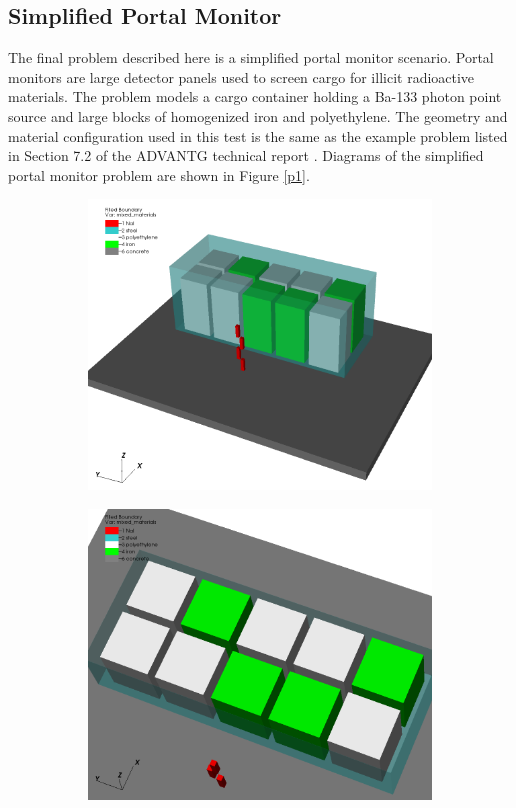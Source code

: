 \documentclass{article} %
\begin{document}
\subsection{Simplified Portal Monitor}

The final problem described here is a simplified portal monitor scenario.
Portal monitors are large detector panels used to screen cargo for illicit
radioactive materials. The problem models a cargo container holding a Ba-133
photon point source and large blocks of homogenized iron and polyethylene. 
The geometry and material configuration used in this test is the same as the
example problem listed in Section 7.2 of the ADVANTG technical report
\cite{advantg}. Diagrams of the simplified portal monitor problem are shown in
Figure \ref{p1}.

\begin{figure}[!htb]
\centering
\begin{subfigure}{0.475\textwidth}
\includegraphics[width=\textwidth]{img/portal1.png}
\end{subfigure}
\begin{subfigure}{0.475\textwidth}
\includegraphics[width=\textwidth]{img/portal2.png}

\end{subfigure}
\end{figure}
\end{document}
